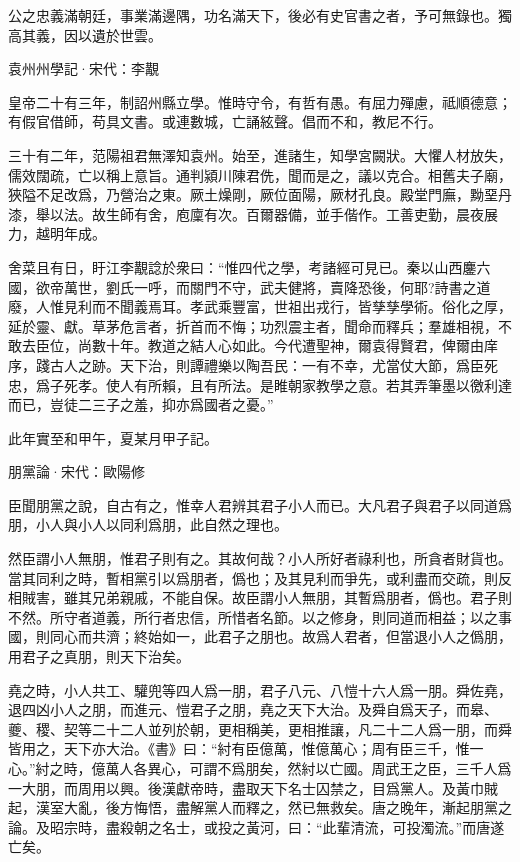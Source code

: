 \documentclass[12pt,a4paper]{ctexbook}
\begin{document}
公之忠義滿朝廷，事業滿邊隅，功名滿天下，後必有史官書之者，予可無錄也。獨高其義，因以遺於世雲。\par
袁州州學記·宋代：李覯 \par
皇帝二十有三年，制詔州縣立學。惟時守令，有哲有愚。有屈力殫慮，祗順德意；有假官借師，苟具文書。或連數城，亡誦絃聲。倡而不和，教尼不行。\par
三十有二年，范陽祖君無澤知袁州。始至，進諸生，知學宮闕狀。大懼人材放失，儒效闊疏，亡以稱上意旨。通判潁川陳君侁，聞而是之，議以克合。相舊夫子廟，狹隘不足改爲，乃營治之東。厥土燥剛，厥位面陽，厥材孔良。殿堂門廡，黝堊丹漆，舉以法。故生師有舍，庖廩有次。百爾器備，並手偕作。工善吏勤，晨夜展力，越明年成。\par
舍菜且有日，盱江李覯諗於衆曰：“惟四代之學，考諸經可見已。秦以山西鏖六國，欲帝萬世，劉氏一呼，而關門不守，武夫健將，賣降恐後，何耶?詩書之道廢，人惟見利而不聞義焉耳。孝武乘豐富，世祖出戎行，皆孳孳學術。俗化之厚，延於靈、獻。草茅危言者，折首而不悔；功烈震主者，聞命而釋兵；羣雄相視，不敢去臣位，尚數十年。教道之結人心如此。今代遭聖神，爾袁得賢君，俾爾由庠序，踐古人之跡。天下治，則譚禮樂以陶吾民：一有不幸，尤當仗大節，爲臣死忠，爲子死孝。使人有所賴，且有所法。是睢朝家教學之意。若其弄筆墨以徼利達而已，豈徒二三子之羞，抑亦爲國者之憂。”\par
此年實至和甲午，夏某月甲子記。\par
朋黨論·宋代：歐陽修 \par
臣聞朋黨之說，自古有之，惟幸人君辨其君子小人而已。大凡君子與君子以同道爲朋，小人與小人以同利爲朋，此自然之理也。\par
然臣謂小人無朋，惟君子則有之。其故何哉？小人所好者祿利也，所貪者財貨也。當其同利之時，暫相黨引以爲朋者，僞也；及其見利而爭先，或利盡而交疏，則反相賊害，雖其兄弟親戚，不能自保。故臣謂小人無朋，其暫爲朋者，僞也。君子則不然。所守者道義，所行者忠信，所惜者名節。以之修身，則同道而相益；以之事國，則同心而共濟；終始如一，此君子之朋也。故爲人君者，但當退小人之僞朋，用君子之真朋，則天下治矣。\par
堯之時，小人共工、驩兜等四人爲一朋，君子八元、八愷十六人爲一朋。舜佐堯，退四凶小人之朋，而進元、愷君子之朋，堯之天下大治。及舜自爲天子，而皋、夔、稷、契等二十二人並列於朝，更相稱美，更相推讓，凡二十二人爲一朋，而舜皆用之，天下亦大治。《書》曰：“紂有臣億萬，惟億萬心；周有臣三千，惟一心。”紂之時，億萬人各異心，可謂不爲朋矣，然紂以亡國。周武王之臣，三千人爲一大朋，而周用以興。後漢獻帝時，盡取天下名士囚禁之，目爲黨人。及黃巾賊起，漢室大亂，後方悔悟，盡解黨人而釋之，然已無救矣。唐之晚年，漸起朋黨之論。及昭宗時，盡殺朝之名士，或投之黃河，曰：“此輩清流，可投濁流。”而唐遂亡矣。\par
\end{document}
